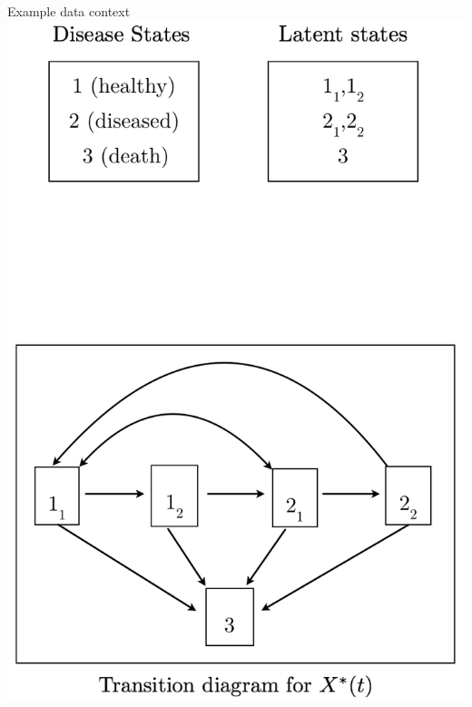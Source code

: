 \documentclass{beamer}
\begin{document}
\begin{frame}{Example data context}
\includegraphics[scale=0.27]{datatransitions2.png}

\end{frame}
\end{document}
